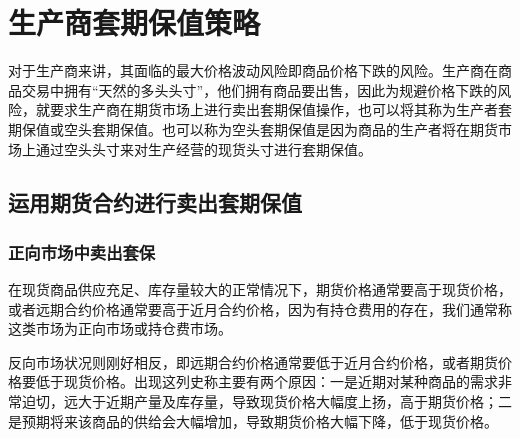 \chapter{生产商套期保值策略}
对于生产商来讲，其面临的最大价格波动风险即商品价格下跌的风险。生产商在商品交易中拥有“天然的多头头寸”，他们拥有商品要出售，因此为规避价格下跌的风险，就要求生产商在期货市场上进行卖出套期保值操作，也可以将其称为生产者套期保值或空头套期保值。也可以称为空头套期保值是因为商品的生产者将在期货市场上通过空头头寸来对生产经营的现货头寸进行套期保值。
\section{运用期货合约进行卖出套期保值}
\subsection{正向市场中卖出套保}
在现货商品供应充足、库存量较大的正常情况下，期货价格通常要高于现货价格，或者远期合约价格通常要高于近月合约价格，因为有持仓费用的存在，我们通常称这类市场为正向市场或持仓费市场。

反向市场状况则刚好相反，即远期合约价格通常要低于近月合约价格，或者期货价格要低于现货价格。出现这列史称主要有两个原因：一是近期对某种商品的需求非常迫切，远大于近期产量及库存量，导致现货价格大幅度上扬，高于期货价格；二是预期将来该商品的供给会大幅增加，导致期货价格大幅下降，低于现货价格。